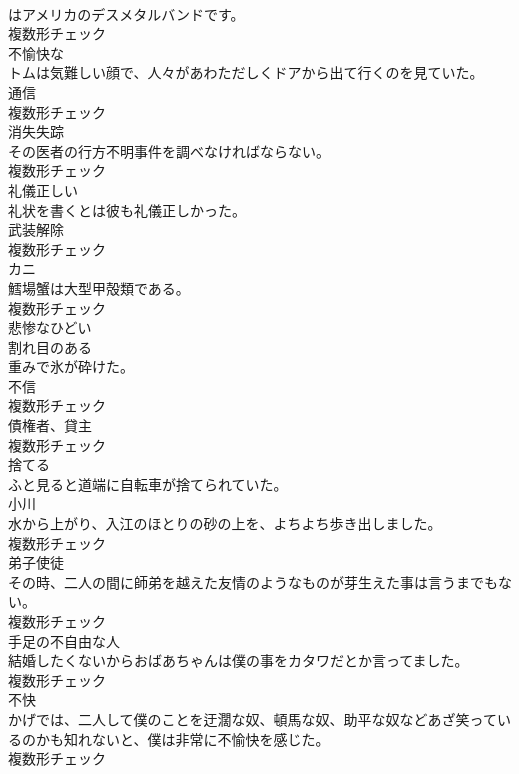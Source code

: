 \documentclass[8pt]{extreport}
\begin{document}
\begin{CJK}{UTF8}{min}
\\	はアメリカのデスメタルバンドです。	
\\	複数形チェック
\\	[形容詞]	不愉快な	
\\	トムは気難しい顔で、人々があわただしくドアから出て行くのを見ていた。	
\\	[名詞]	通信	
\\	複数形チェック
\\	[名詞]	消失失踪	
\\	その医者の行方不明事件を調べなければならない。	
\\	複数形チェック
\\	[形容詞]	礼儀正しい	
\\	礼状を書くとは彼も礼儀正しかった。	
\\	[名詞]	武装解除	
\\	複数形チェック
\\	[名詞]	カニ	
\\	鱈場蟹は大型甲殻類である。	
\\	複数形チェック
\\	[形容詞]	悲惨なひどい	
\\	[形容詞]	割れ目のある	
\\	重みで氷が砕けた。	
\\	[名詞]	不信	
\\	複数形チェック
\\	[名詞]	債権者、貸主	
\\	複数形チェック
\\	[動詞]	捨てる	
\\	ふと見ると道端に自転車が捨てられていた。	
\\	[名詞]	小川	
\\	水から上がり、入江のほとりの砂の上を、よちよち歩き出しました。	
\\	複数形チェック
\\	[名詞]	弟子使徒	
\\	その時、二人の間に師弟を越えた友情のようなものが芽生えた事は言うまでもない。	
\\	複数形チェック
\\	[名詞]	手足の不自由な人	
\\	結婚したくないからおばあちゃんは僕の事をカタワだとか言ってました。	
\\	複数形チェック
\\	[名詞]	不快	
\\	かげでは、二人して僕のことを迂濶な奴、頓馬な奴、助平な奴などあざ笑っているのかも知れないと、僕は非常に不愉快を感じた。	
\\	複数形チェック

\end{CJK}
\end{document}
